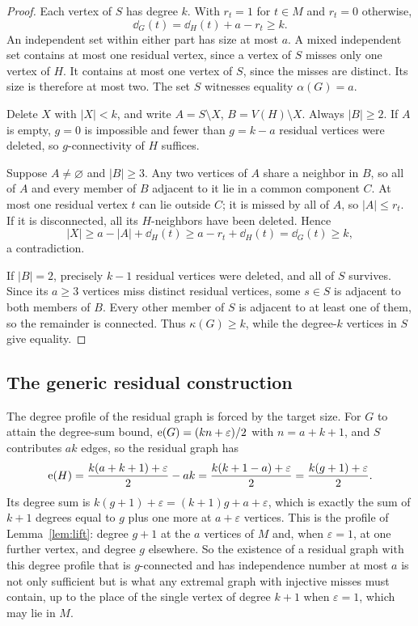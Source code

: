 \begin{proof}
Each vertex of $S$ has degree $k$.
With $r_t=1$ for $t\in M$ and $r_t=0$ otherwise,
\begin{equation}
\dd_G(t)=\dd_H(t)+a-r_t\ge k.
\end{equation}
An independent set within either part has size at most $a$.
A mixed independent set contains at most one residual vertex, since a vertex of $S$ misses only one vertex of $H$.
It contains at most one vertex of $S$, since the misses are distinct.
Its size is therefore at most two. The set $S$ witnesses equality $\alpha(G)=a$.

Delete $X$ with $|X|<k$, and write $A=S\setminus X$, $B=V(H)\setminus X$.
Always $|B|\ge2$.
If $A$ is empty, $g=0$ is impossible and fewer than $g=k-a$ residual vertices were deleted, so $g$-connectivity of $H$ suffices.

Suppose $A\ne\varnothing$ and $|B|\ge3$.
Any two vertices of $A$ share a neighbor in $B$, so all of $A$ and every member of $B$ adjacent to it lie in a common component $C$.
At most one residual vertex $t$ can lie outside $C$; it is missed by all of $A$, so $|A|\le r_t$.
If it is disconnected, all its $H$-neighbors have been deleted. Hence
\begin{equation}
|X|\ge a-|A|+\dd_H(t)\ge a-r_t+\dd_H(t)=\dd_G(t)\ge k,
\end{equation}
a contradiction.

If $|B|=2$, precisely $k-1$ residual vertices were deleted, and all of $S$ survives.
Since its $a\ge3$ vertices miss distinct residual vertices, some $s\in S$ is adjacent to both members of $B$.
Every other member of $S$ is adjacent to at least one of them, so the remainder is connected.
Thus $\kappa(G)\ge k$, while the degree-$k$ vertices in $S$ give equality.
\end{proof}

\subsection{The generic residual construction}

The degree profile of the residual graph is forced by the target size.
For $G$ to attain the degree-sum bound, $\mathrm{e}(G)=(kn+\varepsilon)/2$ with $n=a+k+1$, and $S$ contributes $ak$ edges, so the residual graph has
\begin{equation}
\mathrm{e}(H)=\frac{k(a+k+1)+\varepsilon}2-ak=\frac{k(k+1-a)+\varepsilon}2=\frac{k(g+1)+\varepsilon}2 .
\end{equation}
Its degree sum is $k(g+1)+\varepsilon=(k+1)g+a+\varepsilon$, which is exactly the sum of $k+1$ degrees equal to $g$ plus one more at $a+\varepsilon$ vertices.
This is the profile of Lemma~\ref{lem:lift}: degree $g+1$ at the $a$ vertices of $M$ and, when $\varepsilon=1$, at one further vertex, and degree $g$ elsewhere.
So the existence of a residual graph with this degree profile that is $g$-connected and has independence number at most $a$ is not only sufficient but is what any extremal graph with injective misses must contain, up to the place of the single vertex of degree $k+1$ when $\varepsilon=1$, which may lie in $M$.

